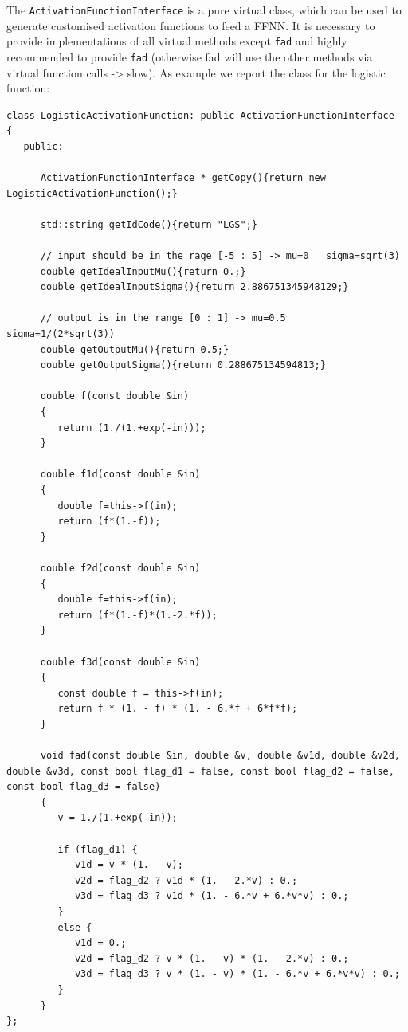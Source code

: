 \documentclass[11pt,a4paper,twoside]{article}
\begin{document}
The \verb+ActivationFunctionInterface+ is a pure virtual class, which can be used to generate customised activation functions to feed a FFNN.
It is necessary to provide implementations of all virtual methods except \verb+fad+ and highly recommended to provide \verb+fad+ (otherwise fad will use the other methods via virtual function calls -> slow).
As example we report the class for the logistic function:

\begin{lstlisting}
class LogisticActivationFunction: public ActivationFunctionInterface
{
   public:

      ActivationFunctionInterface * getCopy(){return new LogisticActivationFunction();}
      
      std::string getIdCode(){return "LGS";}

      // input should be in the rage [-5 : 5] -> mu=0   sigma=sqrt(3)
      double getIdealInputMu(){return 0.;}
      double getIdealInputSigma(){return 2.886751345948129;}

      // output is in the range [0 : 1] -> mu=0.5   sigma=1/(2*sqrt(3))
      double getOutputMu(){return 0.5;}
      double getOutputSigma(){return 0.288675134594813;}

      double f(const double &in)
      {
         return (1./(1.+exp(-in)));
      }

      double f1d(const double &in)
      {
         double f=this->f(in);
         return (f*(1.-f));
      }

      double f2d(const double &in)
      {
         double f=this->f(in);
         return (f*(1.-f)*(1.-2.*f));
      }

      double f3d(const double &in)
      {
         const double f = this->f(in);
         return f * (1. - f) * (1. - 6.*f + 6*f*f);
      }

      void fad(const double &in, double &v, double &v1d, double &v2d, double &v3d, const bool flag_d1 = false, const bool flag_d2 = false, const bool flag_d3 = false)
      {
         v = 1./(1.+exp(-in));

         if (flag_d1) {
            v1d = v * (1. - v);
            v2d = flag_d2 ? v1d * (1. - 2.*v) : 0.;
            v3d = flag_d3 ? v1d * (1. - 6.*v + 6.*v*v) : 0.;
         }
         else {
            v1d = 0.;
            v2d = flag_d2 ? v * (1. - v) * (1. - 2.*v) : 0.;
            v3d = flag_d3 ? v * (1. - v) * (1. - 6.*v + 6.*v*v) : 0.;
         }
      }
};

\end{lstlisting}
\end{document}
